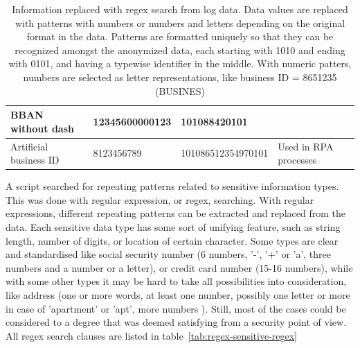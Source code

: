 \begin{table}[]
\begin{tabularx}{\textwidth}{|L{0.17\textwidth}|L{0.27\textwidth}|L{0.30\textwidth}|Y|}
        BBAN without dash &
        12345600000123 &
        101088420101 &
        \\ \hline
        Artificial business ID &
        8123456789 &
        101086512354970101 &
        Used in RPA processes
        \\ \hline
    \end{tabularx}
    \caption{Information replaced with regex search from log data.
        Data values are replaced with patterns with numbers or numbers and letters
        depending on the original format in the data.
        Patterns are formatted uniquely so that they can be recognized amongst the anonymized data,
        each starting with 1010 and ending with 0101,
        and having a typewise identifier in the middle.
        With numeric patters,
        numbers are selected as letter representations,
        like business ID = 8651235 (BUSINES)}
    \label{tab:regex-sensitive-info}
\end{table}

A script searched for repeating patterns related to sensitive information types.
This was done with regular expression, or regex, searching.
With regular expressions,
different repeating patterns can be extracted and replaced from the data.
Each sensitive data type has some sort of unifying feature,
such as string length, number of digits, or location of certain character.\cite{li2008regular}
Some types are clear and standardised like social security number
(6 numbers, '-', '+' or 'a', three numbers and a number or a letter),
or credit card number (15-16 numbers),
while with some other types it may be hard
to take all possibilities into consideration,
like address (one or more words, at least one number,
possibly one letter or more in case of 'apartment' or 'apt', more numbers \etc).
Still,
most of the cases could be considered to a degree
that was deemed satisfying from a security point of view.
All regex search clauses are listed in table~\ref{tab:regex-sensitive-regex}

